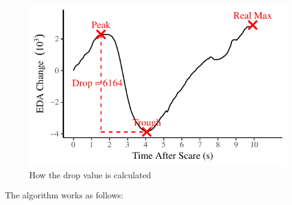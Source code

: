 \documentclass[12pt,a4paper]{article}\usepackage[]{graphicx}\usepackage[]{color}
\makeatletter
\def\maxwidth{ %
  \ifdim\Gin@nat@width>\linewidth
    \linewidth
  \else
    \Gin@nat@width
  \fi
}
\makeatother
\begin{document}
\begin{figure}[htb]


{\centering \includegraphics[width=\maxwidth]{figure/ExampleScare-1} 

}



	\caption{How the drop value is calculated}
	\label{fig:ExampleScare}
\end{figure}

The algorithm works as follows:
\end{document}
